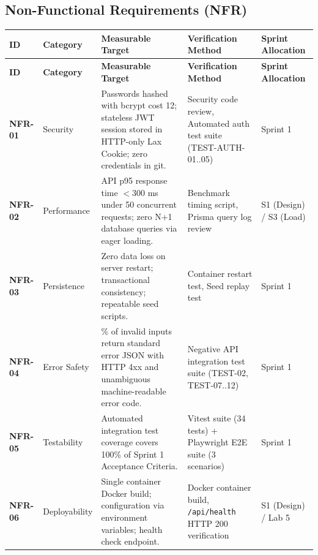 \documentclass[11pt,a4paper]{article}
\begin{document}
\subsection{Non-Functional Requirements (NFR)}

\vspace{0.3em}
\begin{longtable}{|>{\RaggedRight}p{1.4cm}|>{\RaggedRight}p{2.0cm}|>{\RaggedRight}p{4.2cm}|>{\RaggedRight}p{5.0cm}|>{\centering\arraybackslash}p{1.8cm}|}
\hline
\rowcolor{zenPale}\textbf{ID} & \textbf{Category} & \textbf{Measurable Target} & \textbf{Verification Method} & \textbf{Sprint Allocation} \\ \hline
\endfirsthead
\hline
\rowcolor{zenPale}\textbf{ID} & \textbf{Category} & \textbf{Measurable Target} & \textbf{Verification Method} & \textbf{Sprint Allocation} \\ \hline
\endhead
\hline
\endfoot
\textbf{NFR-01} & Security & Passwords hashed with bcrypt cost 12; stateless JWT session stored in HTTP-only Lax Cookie; zero credentials in git. & Security code review, Automated auth test suite (TEST-AUTH-01..05) & Sprint 1 \\ \hline
\textbf{NFR-02} & Performance & API p95 response time $< 300$ ms under 50 concurrent requests; zero N+1 database queries via eager loading. & Benchmark timing script, Prisma query log review & S1 (Design) / S3 (Load) \\ \hline
\textbf{NFR-03} & Persistence & Zero data loss on server restart; transactional consistency; repeatable seed scripts. & Container restart test, Seed replay test & Sprint 1 \\ \hline
\textbf{NFR-04} & Error Safety & 100\% of invalid inputs return standard error JSON with HTTP 4xx and unambiguous machine-readable error code. & Negative API integration test suite (TEST-02, TEST-07..12) & Sprint 1 \\ \hline
\textbf{NFR-05} & Testability & Automated integration test coverage covers 100\% of Sprint 1 Acceptance Criteria. & Vitest suite (34 tests) + Playwright E2E suite (3 scenarios) & Sprint 1 \\ \hline
\textbf{NFR-06} & Deployability & Single container Docker build; configuration via environment variables; health check endpoint. & Docker container build, \texttt{/api/health} HTTP 200 verification & S1 (Design) / Lab 5 \\ \hline
\end{longtable}
\vspace{0.3em}
\end{document}
